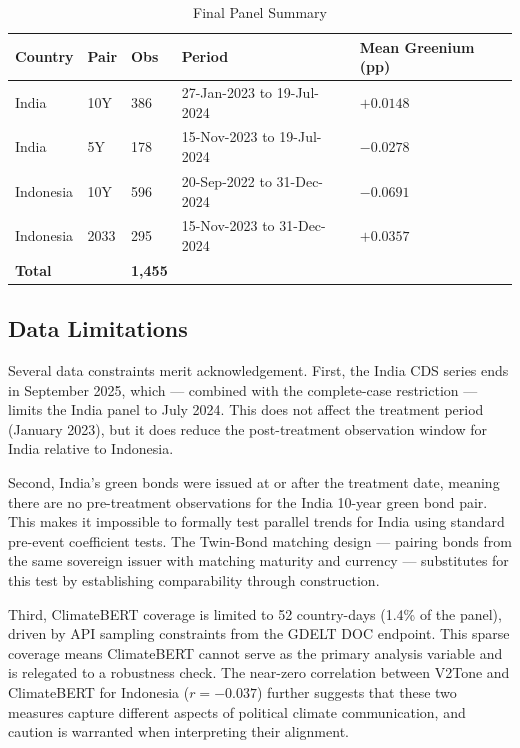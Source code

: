 \documentclass[12pt,a4paper]{article}
\begin{document}
\begin{table}[H]
\caption{Final Panel Summary}
\label{tab:panel}
\centering
\small
{}
\begin{tabular}{L{2.2cm} C{1.2cm} C{1.0cm} L{4.8cm} R{2.5cm}}
\toprule
{}
\textbf{Country} & \textbf{Pair} & \textbf{Obs} & \textbf{Period} & \textbf{Mean Greenium (pp)} \\
\midrule
India     & 10Y  & 386 & 27-Jan-2023 to 19-Jul-2024  & $+0.0148$ \\
India     & 5Y   & 178 & 15-Nov-2023 to 19-Jul-2024  & $-0.0278$ \\
Indonesia & 10Y  & 596 & 20-Sep-2022 to 31-Dec-2024  & $-0.0691$ \\
Indonesia & 2033 & 295 & 15-Nov-2023 to 31-Dec-2024  & $+0.0357$ \\
\midrule
\textbf{Total} & & \textbf{1,455} & & \\
\bottomrule
\end{tabular}
\end{table}

\subsection{Data Limitations}

Several data constraints merit acknowledgement. First, the India CDS series ends in September 2025, which --- combined with the complete-case restriction --- limits the India panel to July 2024. This does not affect the treatment period (January 2023), but it does reduce the post-treatment observation window for India relative to Indonesia.

Second, India's green bonds were issued at or after the treatment date, meaning there are no pre-treatment observations for the India 10-year green bond pair. This makes it impossible to formally test parallel trends for India using standard pre-event coefficient tests. The Twin-Bond matching design --- pairing bonds from the same sovereign issuer with matching maturity and currency --- substitutes for this test by establishing comparability through construction.

Third, ClimateBERT coverage is limited to 52 country-days (1.4\% of the panel), driven by API sampling constraints from the GDELT DOC endpoint. This sparse coverage means ClimateBERT cannot serve as the primary analysis variable and is relegated to a robustness check. The near-zero correlation between V2Tone and ClimateBERT for Indonesia ($r = -0.037$) further suggests that these two measures capture different aspects of political climate communication, and caution is warranted when interpreting their alignment.
\end{document}
